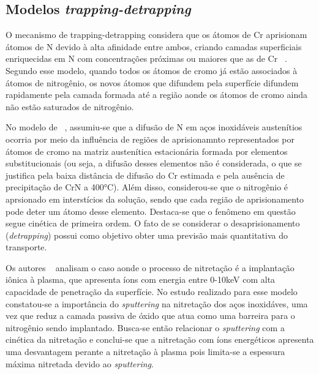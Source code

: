 \documentclass[]{politex}
\begin{document}
\subsection{Modelos \textit{trapping-detrapping}}
\label{sec:trap-detrap}
	O mecanismo de trapping-detrapping considera que os átomos de Cr aprisionam átomos de N devido à alta afinidade entre ambos, criando camadas superficiais enriquecidas em N com concentrações próximas ou maiores que as de Cr ~\cite{parascandola2000nitrogen}. Segundo esse modelo, quando todos os átomos de cromo já estão associados à átomos de nitrogênio, os novos átomos que difundem pela superfície difundem rapidamente pela camada formada até a região aonde os átomos de cromo ainda não estão saturados de nitrogênio.  \par
	No modelo de ~\cite{parascandola2000nitrogen}, assumiu-se que a difusão de N em aços inoxidáveis austenítios ocorria por meio da influência de regiões de aprisionamnto representados por átomos de cromo na matriz austenítica estacionária formada por elementos substitucionais (ou seja, a difusão desses elementos não é considerada, o que se justifica pela baixa distância de difusão do Cr estimada e pela ausência de precipitação de CrN a 400°C). Além disso, considerou-se que o nitrogênio é aprsionado em interstícios da solução, sendo que cada região de aprisionamento pode deter um átomo desse elemento. Destaca-se que o fenômeno em questão segue cinética de primeira ordem. O fato de se considerar o desaprisionamento (\textit{detrapping}) possui como objetivo obter uma previsão mais quantitativa do transporte. \par
	Os autores ~\cite{moller2001surface} analisam o caso aonde o processo de nitretação é a implantação iônica à plasma, que apresenta íons com energia entre 0-10keV com alta capacidade de penetração da superfície. No estudo realizado para esse modelo constatou-se a importância do \textit{sputtering} na nitretação dos aços inoxidáves, uma vez que reduz a camada passiva de óxido que atua como uma barreira para o nitrogênio sendo implantado. Busca-se então relacionar o \textit{sputtering} com a cinética da nitretação e conclui-se que a nitretação com íons energéticos apresenta uma desvantagem perante a nitretação à plasma pois limita-se a espessura máxima nitretada devido ao \textit{sputtering}. \par
\end{document}
